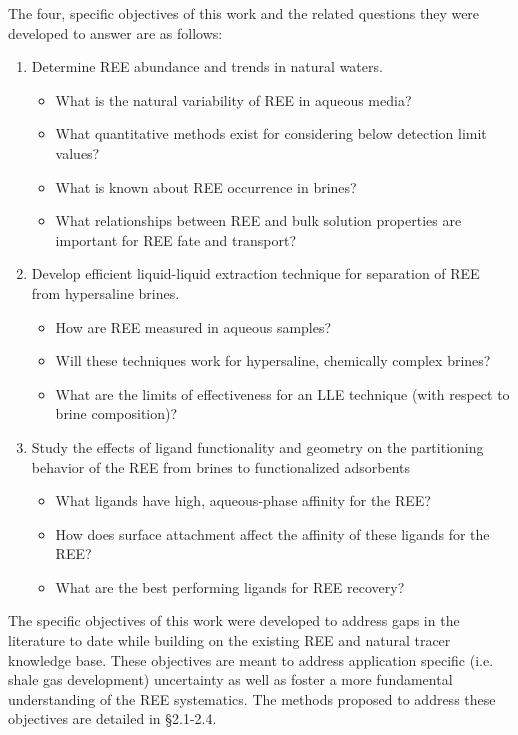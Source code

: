 The four, specific objectives of this work and the related questions they were developed to answer are as follows:
\begin{enumerate}
	\item Determine REE abundance and trends in natural waters.
	\begin{itemize}
		\item	What is the natural variability of REE in aqueous media?
		\item	What quantitative methods exist for considering below detection limit values?
		\item	What is known about REE occurrence in brines?
		\item	What relationships between REE and bulk solution properties are important for REE fate and transport?
	\end{itemize}
	\item Develop efficient liquid-liquid extraction technique for separation of REE from hypersaline brines.
	\begin{itemize}
		\item	How are REE measured in aqueous samples?
		\item Will these techniques work for hypersaline, chemically complex brines?
		\item What are the limits of effectiveness for an LLE technique (with respect to brine composition)?
	\end{itemize}
	\item	Study the effects of ligand functionality and geometry on the partitioning behavior of the REE from brines to functionalized adsorbents
	\begin{itemize}
		\item	What ligands have high, aqueous-phase affinity for the REE?
		\item How does surface attachment affect the affinity of these ligands for the REE?
		\item What are the best performing ligands for REE recovery?
	\end{itemize}
\end{enumerate}

The specific objectives of this work were developed to address gaps in the literature to date while building on the existing REE and natural tracer knowledge base. These objectives are meant to address application specific (i.e. shale gas development) uncertainty as well as foster a more fundamental understanding of the REE systematics. The methods proposed to address these objectives are detailed in \S2.1-2.4.
